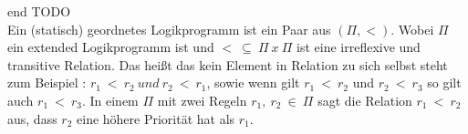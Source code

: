 end TODO\\




Ein (statisch) geordnetes Logikprogramm ist ein Paar aus $(\Pi,<)$.
Wobei $\Pi$ ein extended Logikprogramm ist und $<~\subseteq~\Pi~x~\Pi$ ist
eine irreflexive und transitive Relation. Das heißt das kein Element in Relation
zu sich selbst steht zum Beispiel : $r_1~<~r_2~ und~r_2~<~r_1$, sowie wenn
gilt $r_1~<~r_2$ und $r_2~<~r_3$ so gilt auch $r_1~<~r_3$.
In einem $\Pi$ mit zwei Regeln $r_1,~r_2~\in~\Pi$ sagt die Relation
$r_1~<~r_2$ aus, dass $r_2$ eine höhere Priorität hat als $r_1$.
